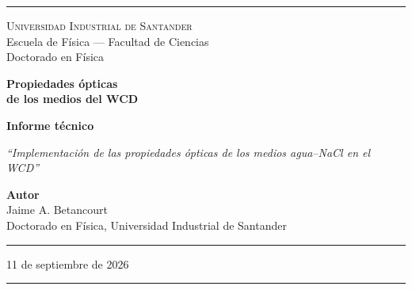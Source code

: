 \documentclass[11pt,a4paper]{article}
\newcommand{\codigo}[1]{\texttt{#1}}
\begin{document}
\pagestyle{empty}


\begin{titlepage}
\begin{center}

\vspace*{0.5cm}
\textcolor{reglaColor}{\rule{\linewidth}{1.2pt}}

\vspace{1.3cm}
{\Large\scshape Universidad Industrial de Santander}\\[0.2cm]
{\large Escuela de Física --- Facultad de Ciencias}\\[0.2cm]
{\large Doctorado en Física}

\vspace{2.2cm}
{\Huge\bfseries\color{tituloColor} Propiedades ópticas\\[0.2cm]
de los medios del WCD}

\vspace{1.8cm}
{\large\textbf{Informe técnico}}

\vspace{0.6cm}
\begin{minipage}{0.82\linewidth}
\centering
\textit{``Implementación de las propiedades ópticas de los medios agua--NaCl en el WCD''}
\end{minipage}

\vfill

{\large\textbf{Autor}}\\[0.15cm]
Jaime A. Betancourt\\[0.1cm]
Doctorado en Física, Universidad Industrial de Santander

\vspace{1.2cm}
\textcolor{reglaColor}{\rule{0.5\linewidth}{0.6pt}}

\vspace{1cm}
11 de septiembre de 2026

\vspace{1cm}
\textcolor{reglaColor}{\rule{\linewidth}{1.2pt}}

\end{center}
\end{titlepage}

\pagestyle{plain}

\begin{abstract}
Se documenta la ampliación de \codigo{Materials-mejorado.cc} para asignar una
tabla de propiedades ópticas independiente al agua pura y a las soluciones con
2.5, 5.0 y 10.0\,\% de NaCl. Cada tabla combina un índice de refracción
espectral específico con la longitud de absorción suministrada y conserva,
como aproximación explícita, el modelo Mie preexistente del ejemplo OpNovice de
Geant4. \codigo{SaltyWCD-mejorado.cc} selecciona el material completo y
comprueba que la tabla óptica esté asociada al volumen activo.
\end{abstract}
\end{document}
